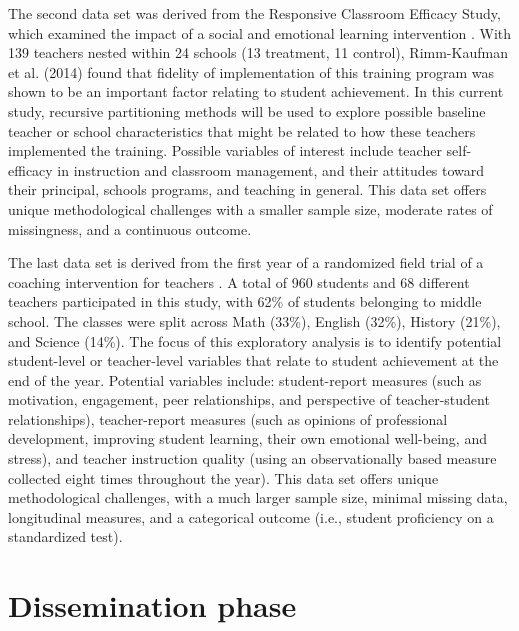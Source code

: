 The second data set was derived from the Responsive Classroom Efficacy Study, which examined the impact of a social and emotional learning intervention \cite{rimm2013efficacy}. With 139 teachers nested within 24 schools (13 treatment, 11 control), Rimm-Kaufman et al. (2014) found that fidelity of implementation of this training program was shown to be an important factor relating to student achievement. In this current study, recursive partitioning methods will be used to explore possible baseline teacher or school characteristics that might be related to how these teachers implemented the training. Possible variables of interest include teacher self-efficacy in instruction and classroom management, and their attitudes toward their principal, schools programs, and teaching in general. This data set offers unique methodological challenges with a smaller sample size, moderate rates of missingness, and a continuous outcome.


The last data set is derived from the first year of a randomized field trial of a coaching intervention for teachers \cite{allen2011interaction}. A total of 960 students and 68 different teachers participated in this study, with 62\% of students belonging to middle school. The classes were split across Math (33\%), English (32\%), History (21\%), and Science (14\%). The focus of this exploratory analysis is to identify potential student-level or teacher-level variables that relate to student achievement at the end of the year. Potential variables include: student-report measures (such as motivation, engagement, peer relationships, and perspective of teacher-student relationships), teacher-report measures (such as opinions of professional development, improving student learning, their own emotional well-being, and stress), and teacher instruction quality (using an observationally based measure collected eight times throughout the year). This data set offers unique methodological challenges, with a much larger sample size, minimal missing data, longitudinal measures, and a categorical outcome (i.e., student proficiency on a standardized test).



\section{Dissemination phase}

